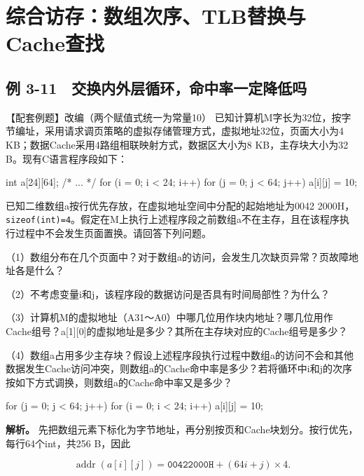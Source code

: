 \section{综合访存：数组次序、TLB替换与Cache查找}\label{CO03-28}

\subsection{例 3-11　交换内外层循环，命中率一定降低吗}\label{CO03-29}

\begin{example}[配套例题]

【配套例题】改编（两个赋值式统一为常量10） 已知计算机M字长为32位，按字节编址，采用请求调页策略的虚拟存储管理方式，虚拟地址32位，页面大小为4 KB；数据Cache采用4路组相联映射方式，数据区大小为8 KB，主存块大小为32 B。现有C语言程序段如下：

\begin{codeblock}[language=C]
int a[24][64];
/* ... */
for (i = 0; i < 24; i++)
    for (j = 0; j < 64; j++) a[i][j] = 10;
\end{codeblock}

已知二维数组a按行优先存放，在虚拟地址空间中分配的起始地址为0042 2000H，\texttt{sizeof(\allowbreak{}int)\allowbreak{}=\allowbreak{}4}。假定在M上执行上述程序段之前数组a不在主存，且在该程序执行过程中不会发生页面置换。请回答下列问题。

（1）数组分布在几个页面中？对于数组a的访问，会发生几次缺页异常？页故障地址各是什么？

（2）不考虑变量i和j，该程序段的数据访问是否具有时间局部性？为什么？

（3）计算机M的虚拟地址（A31～A0）中哪几位用作块内地址？哪几位用作Cache组号？a{[}1{]}{[}0{]}的虚拟地址是多少？其所在主存块对应的Cache组号是多少？

（4）数组a占用多少主存块？假设上述程序段执行过程中数组a的访问不会和其他数据发生Cache访问冲突，则数组a的Cache命中率是多少？若将循环中i和j的次序按如下方式调换，则数组a的Cache命中率又是多少？

\begin{codeblock}[language=C]
for (j = 0; j < 64; j++)
    for (i = 0; i < 24; i++) a[i][j] = 10;
\end{codeblock}

\end{example}

\textbf{解析。} 先把数组元素下标化为字节地址，再分别按页和Cache块划分。按行优先，每行64个int，共256 B，因此

\[
\operatorname{addr}(a[i][j])=\mathtt{00422000H}+(64i+j)\times4.
\]

